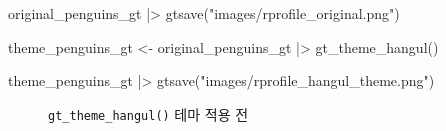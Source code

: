 \documentclass[
  letterpaper,
]{book}
\newenvironment{Shaded}{\begin{snugshade}}{\end{snugshade}}
\newcommand{\FunctionTok}[1]{\textcolor[rgb]{0.28,0.35,0.67}{#1}}
\newcommand{\NormalTok}[1]{\textcolor[rgb]{0.00,0.23,0.31}{#1}}
\newcommand{\OtherTok}[1]{\textcolor[rgb]{0.00,0.23,0.31}{#1}}
\newcommand{\SpecialCharTok}[1]{\textcolor[rgb]{0.37,0.37,0.37}{#1}}
\newcommand{\StringTok}[1]{\textcolor[rgb]{0.13,0.47,0.30}{#1}}
\begin{document}
\begin{Shaded}
\begin{Highlighting}[]
\NormalTok{original\_penguins\_gt }\SpecialCharTok{|\textgreater{}} 
  \FunctionTok{gtsave}\NormalTok{(}\StringTok{"images/rprofile\_original.png"}\NormalTok{)}

\NormalTok{theme\_penguins\_gt }\OtherTok{\textless{}{-}}\NormalTok{ original\_penguins\_gt }\SpecialCharTok{|\textgreater{}} 
  \FunctionTok{gt\_theme\_hangul}\NormalTok{()}

\NormalTok{theme\_penguins\_gt }\SpecialCharTok{|\textgreater{}} 
  \FunctionTok{gtsave}\NormalTok{(}\StringTok{"images/rprofile\_hangul\_theme.png"}\NormalTok{)}
\end{Highlighting}
\end{Shaded}

\begin{figure}

\begin{minipage}[t]{0.49\linewidth}

{\centering 


\caption{\texttt{gt\_theme\_hangul()} 테마 적용 전}

}
\end{minipage}
\end{figure}
\end{document}
